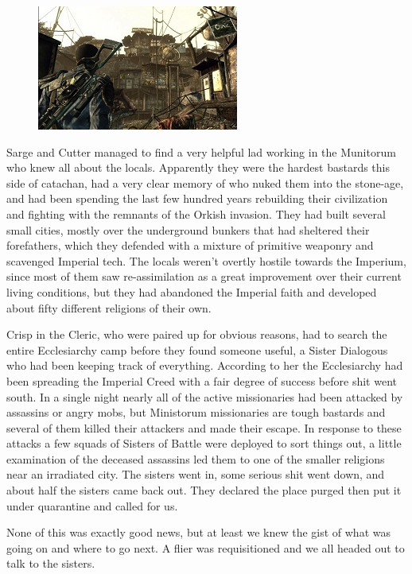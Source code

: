 \begin{figure}
	\begin{center}
		\includegraphics[width=\figwidth]{pics/6/6.png}
	\end{center}
\end{figure}
Sarge and Cutter managed to find a very helpful lad working in the Munitorum who knew all about the locals. 
Apparently they were the hardest bastards this side of catachan, had a very clear memory of who nuked them into the stone-age, and had been spending the last few hundred years rebuilding their civilization and fighting with the remnants of the Orkish invasion. 
They had built several small cities, mostly over the underground bunkers that had sheltered their forefathers, which they defended with a mixture of primitive weaponry and scavenged Imperial tech. 
The locals weren't overtly hostile towards the Imperium, since most of them saw re-assimilation as a great improvement over their current living conditions, but they had abandoned the Imperial faith and developed about fifty different religions of their own.

Crisp in the Cleric, who were paired up for obvious reasons, had to search the entire Ecclesiarchy camp before they found someone useful, a Sister Dialogous who had been keeping track of everything. 
According to her the Ecclesiarchy had been spreading the Imperial Creed with a fair degree of success before shit went south. 
In a single night nearly all of the active missionaries had been attacked by assassins or angry mobs, but Ministorum missionaries are tough bastards and several of them killed their attackers and made their escape. 
In response to these attacks a few squads of Sisters of Battle were deployed to sort things out, a little examination of the deceased assassins led them to one of the smaller religions near an irradiated city. 
The sisters went in, some serious shit went down, and about half the sisters came back out. 
They declared the place purged then put it under quarantine and called for us.

None of this was exactly good news, but at least we knew the gist of what was going on and where to go next. 
A flier was requisitioned and we all headed out to talk to the sisters.

